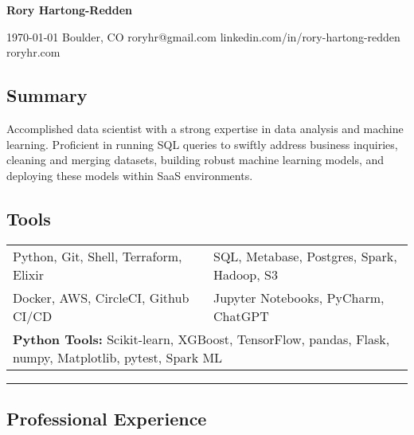 \documentclass[10pt,letterpaper]{article}
\newenvironment{indentsection}[1]
{\begin{list}{}%
	{\setlength{\leftmargin}{#1}}
	\item[]%
}
{\end{list}}
\begin{document}
{\raggedright \LARGE \bf Rory Hartong-Redden}

{\raggedleft 
\today \/ \textbar
\/ Boulder, CO \textbar
\/ roryhr@gmail.com \textbar
\/ linkedin.com/in/rory-hartong-redden \textbar
\/ roryhr.com
\\
}

\subsection*{Summary}
\begin{centering}  
Accomplished data scientist with a strong expertise in data analysis and machine learning. Proficient in running SQL queries to swiftly address business inquiries, cleaning and merging datasets, building robust machine learning models, and deploying these models within SaaS environments.
\end{centering}

\subsection*{Tools}
\begin{indentsection}{\parindent}
\begin{tabular}{p{0.5\linewidth}   p{0.5\linewidth}} 
	Python, Git, Shell, Terraform, Elixir
	& SQL, Metabase, Postgres, Spark, Hadoop, S3 \\

	Docker, AWS, CircleCI, Github CI/CD
	& Jupyter Notebooks, PyCharm, ChatGPT\\ 
	
	\multicolumn{2}{l}{
		\textbf{Python Tools:} Scikit-learn, XGBoost, TensorFlow, pandas, Flask, numpy, Matplotlib, pytest, Spark ML
		}
\end{tabular}
\end{indentsection}

\hrule
\subsection*{Professional Experience}
\end{document}
